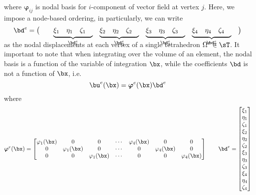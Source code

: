 \documentclass[11pt,titlepage]{article}
\renewcommand{\bphi}{\boldsymbol{\varphi}}
\begin{document}
where $\bphi_{ij}$ is nodal basis for $i$-component of vector field at vertex $j$. Here, we impose a node-based ordering, in particularly, we can write
\[
    \bd^e = 
    \begin{pmatrix}
        &&
        \smash[b]{ \underbrace{\begin{matrix} \xi_1 & \eta_1 & \zeta_1 & \end{matrix}}_{\bd^e_1} } & 
        \smash[b]{ \underbrace{\begin{matrix} \xi_2 & \eta_2 & \zeta_2 & \end{matrix}}_{\bd^e_2} } & 
        \smash[b]{ \underbrace{\begin{matrix} \xi_3 & \eta_3 & \zeta_3 & \end{matrix}}_{\bd^e_3} } & 
        \smash[b]{ \underbrace{\begin{matrix} \xi_4 & \eta_4 & \zeta_4 & \end{matrix}}_{\bd^e_4} } & 
    \end{pmatrix} \\
\]
$ $\\
as the nodal displacements at each vertex of a single tetrahedron $\Omega^e \in\sT$. It important to note that when integrating over the volume of an element, the nodal basis is a function of the variable of integration $\bx$, while the coefficients $\bd$ is not a function of $\bx$, i.e. 
\[
    \bu^e(\bx) = \bphi^e(\bx) \bd^e
\]
where 
\[
    \bphi^e(\bx) =    
    \begin{bmatrix}
        \varphi_1(\bx) & 0 & 0 & \cdots & \varphi_4(\bx) & 0 & 0 \\
        0 & \varphi_1(\bx) & 0 & \cdots & 0 & \varphi_4(\bx) & 0 \\
        0 & 0 & \varphi_1(\bx) & \cdots & 0 & 0 & \varphi_4(\bx) \\
    \end{bmatrix}
    \quad\quad
    \bd^e = 
    \begin{bmatrix}
        \xi_1 \\ \eta_1 \\ \zeta_1 \\
        \xi_2 \\ \eta_2 \\ \zeta_2 \\
        \xi_3 \\ \eta_3 \\ \zeta_3 \\
        \xi_4 \\ \eta_4 \\ \zeta_4 \\
    \end{bmatrix}
\]
\end{document}
